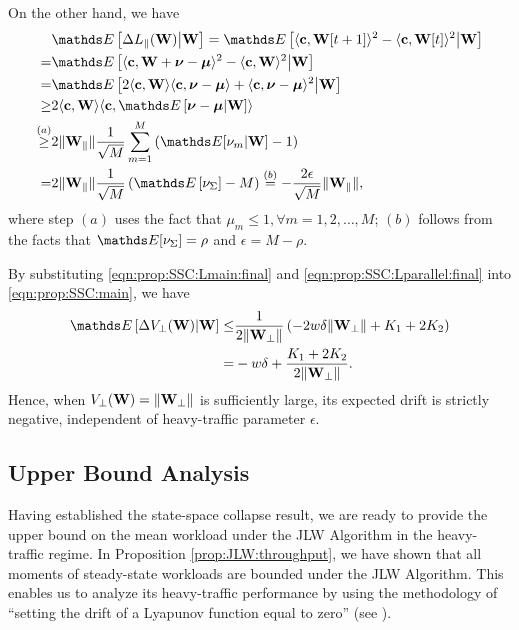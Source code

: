 \documentclass[10pt, conference, letterpaper]{IEEEtran} %
\begin{document}
\begin{IEEEproof}
On the other hand, we have 
\begin{align}
\label{eqn:prop:SSC:Lparallel:final}
&\bE\left[\Delta L_{\parallel}(\mb{W})\middle|\mb{W}\right]=\bE\left[\langle\mb{c},\mb{W}[t+1]\rangle^2-\langle\mb{c},\mb{W}[t]\rangle^2\middle|\mb{W}\right] \nonumber\\
=&\bE\left[\langle\mb{c},\mb{W}+\bs{\nu}-\bs{\mu}\rangle^2-\langle\mb{c},\mb{W}\rangle^2\middle|\mb{W}\right] \nonumber\\
=&\bE\left[2\langle\mb{c},\mb{W}\rangle\langle\mb{c},\bs{\nu}-\bs{\mu}\rangle + \langle\mb{c},\bs{\nu}-\bs{\mu}\rangle^2\middle|\mb{W}\right]\nonumber\\
\geq&2\langle\mb{c},\mb{W}\rangle\langle\mb{c},\bE\left[\bs{\nu}-\bs{\mu}\middle|\mb{W}\right]\rangle\nonumber\\
\stackrel{(a)}{\geq}&2\|\mb{W}_{\parallel}\|\frac{1}{\sqrt{M}}\sum_{m=1}^{M}\left(\bE[\nu_m|\mb{W}]-1\right)\nonumber\\
=&2\|\mb{W}_{\parallel}\|\frac{1}{\sqrt{M}}\left(\bE\left[\nu_{\Sigma}\right]-M\right)\stackrel{(b)}{=}-\frac{2\epsilon}{\sqrt{M}}\|\mb{W}_{\parallel}\|,
\end{align}
where step $(a)$ uses the fact that $\mu_m\leq1, \forall m=1,2,\ldots,M$; $(b)$ follows from the facts that $\bE[\nu_{\Sigma}]=\rho$ and $\epsilon=M-\rho$.

By substituting \eqref{eqn:prop:SSC:Lmain:final} and \eqref{eqn:prop:SSC:Lparallel:final} into \eqref{eqn:prop:SSC:main}, we have 
\begin{align}
\bE\left[\Delta V_{\perp}(\mb{W})\middle|\mb{W}\right]\leq&\frac{1}{2\|\mb{W}_{\perp}\|}\left(-2w\delta\|\mb{W}_{\perp}\|+K_1+2K_2\right)\nonumber\\
=&-w\delta + \frac{K_1+2K_2}{2\|\mb{W}_{\perp}\|}.
\end{align}
Hence, when $V_{\perp}(\mathbf{W})=\|\mathbf{W}_{\perp}\|$ is sufficiently large, its expected drift is strictly negative, independent of heavy-traffic parameter $\epsilon$.
\end{IEEEproof}

\subsection{Upper Bound Analysis}
Having established the state-space collapse result, we are ready to provide the upper bound on the mean workload under the JLW Algorithm in the heavy-traffic regime. In Proposition \ref{prop:JLW:throughput}, we have shown that all moments of steady-state workloads are bounded under the JLW Algorithm. This enables us to analyze its heavy-traffic performance by using the methodology of ``setting the drift of a Lyapunov function equal to zero'' (see \cite{erysri12}).
\end{document}
